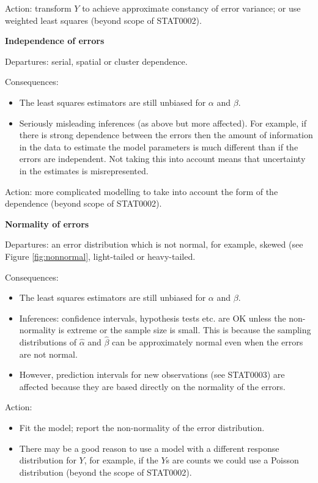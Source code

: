 \documentclass[
  british,
  11pt,
  openany, a4paper]{book}
\providecommand{\tightlist}{%
  \setlength{\itemsep}{0pt}\setlength{\parskip}{0pt}}
\begin{document}
Action: transform \(Y\) to achieve approximate constancy of error variance; or
use weighted least squares (beyond scope of STAT0002).

\textbf{Independence of errors}

Departures: serial, spatial or cluster dependence.

Consequences:

\begin{itemize}
\tightlist
\item
  The least squares estimators are still unbiased for \(\alpha\) and \(\beta\).
\item
  Seriously misleading inferences (as above but more affected). For example, if there is strong dependence between the errors then the amount of information in the data to estimate the model parameters is much different than if the errors are independent. Not taking this into account means that uncertainty in the estimates is misrepresented.
\end{itemize}

Action: more complicated modelling to take into account the form of the dependence (beyond scope of STAT0002).

\textbf{Normality of errors}

Departures: an error distribution which is not normal, for example, skewed (see Figure \ref{fig:nonnormal}, light-tailed or heavy-tailed.

Consequences:

\begin{itemize}
\tightlist
\item
  The least squares estimators are still unbiased for \(\alpha\) and \(\beta\).
\item
  Inferences: confidence intervals, hypothesis tests etc. are OK unless the non-normality is extreme or the sample size is small. This is because the sampling distributions of \(\hat{\alpha}\) and \(\hat{\beta}\) can be approximately normal
  even when the errors are not normal.
\item
  However, prediction intervals for new observations (see STAT0003) are affected because they are based directly on the normality of the errors.
\end{itemize}

Action:

\begin{itemize}
\tightlist
\item
  Fit the model; report the non-normality of the error distribution.
\item
  There may be a good reason to use a model with a different response distribution for \(Y\), for example, if the \(Y\)s are counts we could use a Poisson distribution (beyond the scope of STAT0002).
\end{itemize}
\end{document}
